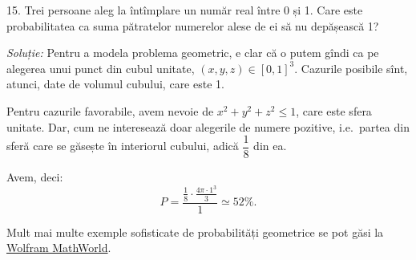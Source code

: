 \vspace{0.3cm}

15. Trei persoane aleg la întîmplare un număr real între 0 și 1. Care este probabilitatea
ca suma pătratelor numerelor alese de ei să nu depășească 1?

\emph{Soluție:} Pentru a modela problema geometric, e clar că o putem gîndi ca pe
alegerea unui punct din cubul unitate, $ (x, y, z) \in [0, 1]^3 $. Cazurile posibile sînt,
atunci, date de volumul cubului, care este 1.

Pentru cazurile favorabile, avem nevoie de $ x^2 + y^2 + z^2 \leq 1 $, care este sfera
unitate. Dar, cum ne interesează doar alegerile de numere pozitive, i.e.\ partea din
sferă care se găsește în interiorul cubului, adică $ \dfrac{1}{8} $ din ea.

Avem, deci:
\[
  P = \frac{ \frac{1}{8} \cdot \frac{4 \pi \cdot 1^3}{3}}{1} \simeq 52\%.
\]


\vspace{0.3cm}

Mult mai multe exemple sofisticate de probabilități geometrice se pot găsi la
\href{http://mathworld.wolfram.com/GeometricProbability.html}{Wolfram MathWorld}.


